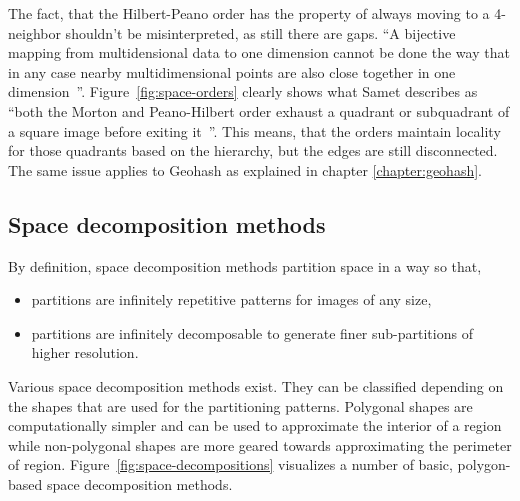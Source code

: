 The fact, that the Hilbert-Peano order has the property of always moving to a 4-neighbor shouldn't be misinterpreted, as still there are gaps. ``A bijective mapping from multidensional data to one dimension cannot be done the way that in any case nearby multidimensional points are also close together in one dimension~\cite{Tropf81multidimensional}''. Figure~\ref{fig:space-orders} clearly shows what Samet describes as ``both the Morton and Peano-Hilbert order exhaust a quadrant or subquadrant of a square image before exiting it~\cite{Samet90spatialdata}''. This means, that the orders maintain locality for those quadrants based on the hierarchy, but the edges are still disconnected. The same issue applies to Geohash as explained in chapter \ref{chapter:geohash}.


\subsection{Space decomposition methods}

By definition, space decomposition methods partition space in a way so that,
\begin{itemize}
\item partitions are infinitely repetitive patterns for images of any size,
\item partitions are infinitely decomposable to generate finer sub-partitions of higher resolution.~\cite{Samet90spatialdata}
\end{itemize}

Various space decomposition methods exist. They can be classified depending on the shapes that are used for the partitioning patterns. Polygonal shapes are computationally simpler and can be used to approximate the interior of a region while non-polygonal shapes are more geared towards approximating the perimeter of region. Figure~\ref{fig:space-decompositions} visualizes a number of basic, polygon-based space decomposition methods. 

